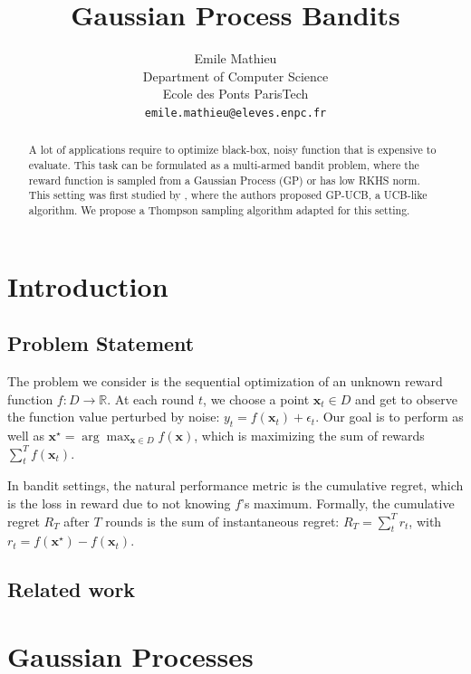 \documentclass{article} %
\title{Gaussian Process Bandits}
\author{
Emile Mathieu \\ %
Department of Computer Science\\
Ecole des Ponts ParisTech\\
\texttt{emile.mathieu@eleves.enpc.fr} \\
}
\begin{document}
\maketitle

\begin{abstract}
A lot of applications require to optimize black-box, noisy function that is expensive to evaluate.
This task can be formulated as a multi-armed bandit problem, where the reward function is sampled from a Gaussian Process (GP) or has low RKHS norm.
This setting was first studied by \citet{DBLP:conf/icml/SrinivasKKS10}, where the authors proposed GP-UCB, a UCB-like algorithm.
We propose a Thompson sampling algorithm adapted for this setting.
\end{abstract}

\section{Introduction}

\subsection{Problem Statement}
The problem we consider is the sequential optimization of an unknown reward function $f : D \rightarrow \mathbb{R}$.
At each round $t$, we choose a point $\mathbf{x}_t \in D$ and get to observe the function value perturbed by noise: $y_t = f(\mathbf{x}_t) + \epsilon_t$.
Our goal is to perform as well as $\mathbf{x}^\star = \arg\max_{\mathbf{x} \in D}  f(\mathbf{x})$, which is maximizing the sum of rewards $\sum_t^T f(\mathbf{x}_t)$.

In bandit settings, the natural performance metric is the cumulative regret, which is the loss in reward due to not knowing $f$'s maximum.
Formally, the cumulative regret $R_T$ after $T$ rounds is the sum of instantaneous regret: $R_T = \sum_t^T r_t$, with $r_t = f(\mathbf{x}^\star) - f(\mathbf{x}_t)$.

\subsection{Related work}




\section{Gaussian Processes}
\end{document}
